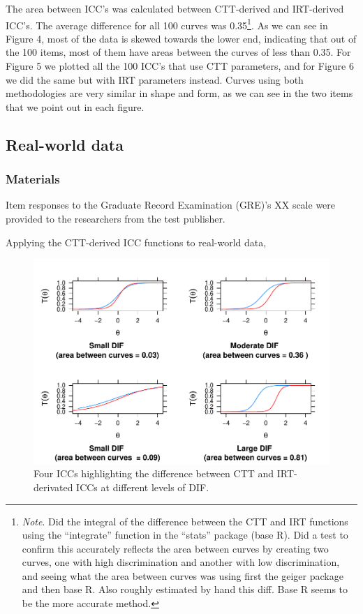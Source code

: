 \documentclass[
  man]{apa6}
\begin{document}
The area between ICC's was calculated between CTT-derived and IRT-derived ICC's. The average difference for all 100 curves was 0.35\footnote{\emph{Note}. Did the integral of the difference between the CTT and IRT functions using the ``integrate'' function in the ``stats'' package (base R). Did a test to confirm this accurately reflects the area between curves by creating two curves, one with high discrimination and another with low discrimination, and seeing what the area between curves was using first the geiger package and then base R. Also roughly estimated by hand this diff. Base R seems to be the more accurate method.}. As we can see in Figure 4, most of the data is skewed towards the lower end, indicating that out of the 100 items, most of them have areas between the curves of less than 0.35.
For Figure 5 we plotted all the 100 ICC's that use CTT parameters, and for Figure 6 we did the same but with IRT parameters instead. Curves using both methodologies are very similar in shape and form, as we can see in the two items that we point out in each figure.

\hypertarget{real-world-data}{%
\subsection{Real-world data}\label{real-world-data}}

\hypertarget{materials}{%
\subsubsection{Materials}\label{materials}}

Item responses to the Graduate Record Examination (GRE)'s XX scale were provided to the researchers from the test publisher.

Applying the CTT-derived ICC functions to real-world data,

\begin{figure}
\centering
\includegraphics{ICC_project_files/figure-latex/plotting-1.pdf}
\caption{\label{fig:plotting}Four ICCs highlighting the difference between CTT and IRT-derivated ICCs at different levels of DIF.}
\end{figure}
\end{document}
